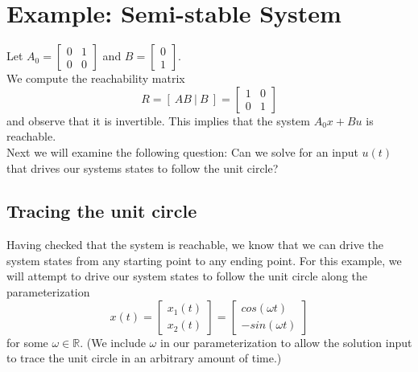 \documentclass[12pt,letterpaper]{article}
\begin{document}
\section{Example: Semi-stable System}
Let $A_{0} = \begin{bmatrix} 0 & 1 \\ 0 & 0 \end{bmatrix}$ and $B = \begin{bmatrix} 0 \\ 1 \end{bmatrix}$. \vspace{5mm} \\

\noindent We compute the reachability matrix \[R = [\  AB\ |\ B\ ] = \begin{bmatrix} 1 & 0 \\ 0 & 1 \end{bmatrix}\] and observe that it is invertible. This implies that the system $A_{0}x + Bu$ is reachable.\\

\noindent Next we will examine the following question: Can we solve for an input $u(t)$ that drives our systems states to follow the unit circle?

\subsection{Tracing the unit circle}
Having checked that the system is reachable, we know that we can drive the system states from any starting point to any ending point. For this example, we will attempt to drive our system states to follow the unit circle along the parameterization \[ x(t) = \begin{bmatrix} x_{1}(t) \\ x_{2}(t) \end{bmatrix} = \begin{bmatrix} cos(\omega t) \\ -sin(\omega t) \end{bmatrix} \] for some $\omega \in \mathbb{R}$. (We include $\omega$ in our parameterization to allow the solution input to trace the unit circle in an arbitrary amount of time.) \vspace{1em}
\end{document}
